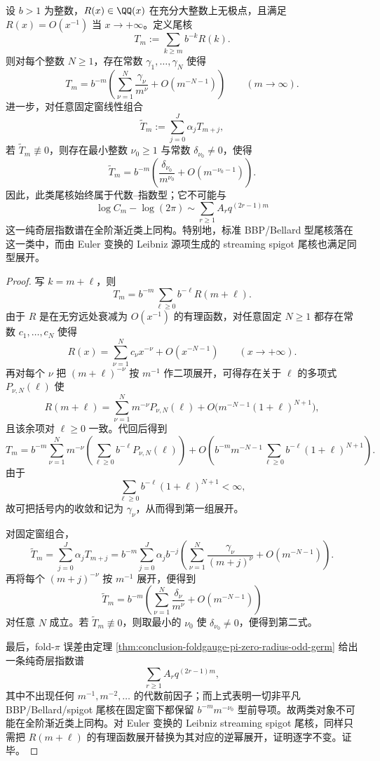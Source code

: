 \begin{theorem}\label{thm:conclusion-foldgauge-pi-bbp-tail-algebraic-exponential-obstruction}
设 \(b>1\) 为整数，\(R(x)\in\QQ(x)\) 在充分大整数上无极点，且满足 \(R(x)=O(x^{-1})\) 当 \(x\to+\infty\)。定义尾核
\[
T_m:=\sum_{k\ge m} b^{-k}R(k).
\]
则对每个整数 \(N\ge 1\)，存在常数 \(\gamma_1,\dots,\gamma_N\) 使得
\[
T_m
=
b^{-m}\left(
\sum_{\nu=1}^{N}\frac{\gamma_\nu}{m^\nu}
+O(m^{-N-1})
\right)
\qquad (m\to\infty).
\]
进一步，对任意固定窗线性组合
\[
\widetilde T_m:=\sum_{j=0}^{J}\alpha_j T_{m+j},
\]
若 \(\widetilde T_m\not\equiv 0\)，则存在最小整数 \(\nu_0\ge 1\) 与常数 \(\delta_{\nu_0}\neq 0\)，使得
\[
\widetilde T_m
=
b^{-m}\left(
\frac{\delta_{\nu_0}}{m^{\nu_0}}
+O(m^{-\nu_0-1})
\right).
\]
因此，此类尾核始终属于代数--指数型；它不可能与
\[
\log C_m-\log(2\pi)\sim\sum_{r\ge 1}A_r q^{(2r-1)m}
\]
这一纯奇层指数谱在全阶渐近类上同构。特别地，标准 BBP/Bellard 型尾核落在这一类中，而由 Euler 变换的 Leibniz 源项生成的 streaming spigot 尾核也满足同型展开。
\end{theorem}
\begin{proof}
写 \(k=m+\ell\)，则
\[
T_m
=
b^{-m}\sum_{\ell\ge 0}b^{-\ell}R(m+\ell).
\]
由于 \(R\) 是在无穷远处衰减为 \(O(x^{-1})\) 的有理函数，对任意固定 \(N\ge 1\) 都存在常数 \(c_1,\dots,c_N\) 使得
\[
R(x)=\sum_{\nu=1}^{N}c_\nu x^{-\nu}+O(x^{-N-1})
\qquad (x\to+\infty).
\]
再对每个 \(\nu\) 把 \((m+\ell)^{-\nu}\) 按 \(m^{-1}\) 作二项展开，可得存在关于 \(\ell\) 的多项式 \(P_{\nu,N}(\ell)\) 使
\[
R(m+\ell)
=
\sum_{\nu=1}^{N}m^{-\nu}P_{\nu,N}(\ell)
+O\!\bigl(m^{-N-1}(1+\ell)^{N+1}\bigr),
\]
且该余项对 \(\ell\ge 0\) 一致。代回后得到
\[
T_m
=
b^{-m}\sum_{\nu=1}^{N}m^{-\nu}
\left(\sum_{\ell\ge 0}b^{-\ell}P_{\nu,N}(\ell)\right)
+O\!\left(
b^{-m}m^{-N-1}\sum_{\ell\ge 0}b^{-\ell}(1+\ell)^{N+1}
\right).
\]
由于
\[
\sum_{\ell\ge 0}b^{-\ell}(1+\ell)^{N+1}<\infty,
\]
故可把括号内的收敛和记为 \(\gamma_\nu\)，从而得到第一组展开。

对固定窗组合，
\[
\widetilde T_m
=
\sum_{j=0}^{J}\alpha_j T_{m+j}
=
b^{-m}\sum_{j=0}^{J}\alpha_j b^{-j}
\left(
\sum_{\nu=1}^{N}\frac{\gamma_\nu}{(m+j)^\nu}
+O(m^{-N-1})
\right).
\]
再将每个 \((m+j)^{-\nu}\) 按 \(m^{-1}\) 展开，便得到
\[
\widetilde T_m
=
b^{-m}\left(
\sum_{\nu=1}^{N}\frac{\delta_\nu}{m^\nu}
+O(m^{-N-1})
\right)
\]
对任意 \(N\) 成立。若 \(\widetilde T_m\not\equiv 0\)，则取最小的 \(\nu_0\) 使 \(\delta_{\nu_0}\neq 0\)，便得到第二式。

最后，fold-\(\pi\) 误差由定理 \ref{thm:conclusion-foldgauge-pi-zero-radius-odd-germ} 给出一条纯奇层指数谱
\[
\sum_{r\ge 1}A_r q^{(2r-1)m},
\]
其中不出现任何 \(m^{-1},m^{-2},\dots\) 的代数前因子；而上式表明一切非平凡 BBP/Bellard/spigot 尾核在固定窗下都保留 \(b^{-m}m^{-\nu_0}\) 型前导项。故两类对象不可能在全阶渐近类上同构。对 Euler 变换的 Leibniz streaming spigot 尾核，同样只需把 \(R(m+\ell)\) 的有理函数展开替换为其对应的逆幂展开，证明逐字不变。证毕。
\end{proof}

